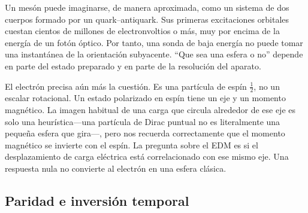 Un mesón puede imaginarse, de manera aproximada, como un sistema de dos cuerpos formado por un quark--antiquark. Sus primeras excitaciones orbitales cuestan cientos de millones de electronvoltios o más, muy por encima de la energía de un fotón óptico. Por tanto, una sonda de baja energía no puede tomar una instantánea de la orientación subyacente. ``Que sea una esfera o no'' depende en parte del estado preparado y en parte de la resolución del aparato.

El electrón precisa aún más la cuestión. Es una partícula de espín \(\tfrac12\), no un escalar rotacional. Un estado polarizado en espín tiene un eje y un momento magnético. La imagen habitual de una carga que circula alrededor de ese eje es solo una heurística---una partícula de Dirac puntual no es literalmente una pequeña esfera que gira---, pero nos recuerda correctamente que el momento magnético se invierte con el espín. La pregunta sobre el EDM es si el desplazamiento de carga eléctrica está correlacionado con ese mismo eje. Una respuesta nula no convierte al electrón en una esfera clásica.

\begin{classroomqa}
\end{classroomqa}

\begin{classroomqa}
\end{classroomqa}

\subsection{Paridad e inversión temporal}

